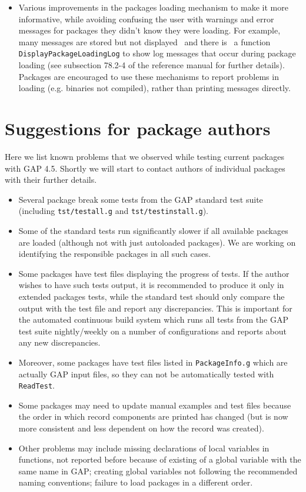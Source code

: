 \documentclass[10pt]{article}
\begin{document}
\begin{itemize}
\item
Various improvements in the packages loading mechanism to make it more
informative, while avoiding confusing the user with warnings and error 
messages for packages they didn't
know they were loading. For example, many messages are stored but not 
displayed \, and there is \, a function {\tt DisplayPackageLoadingLog} to show 
log messages that 
occur during package loading (see subsection 78.2-4 of the reference manual for further details).  
Packages are encouraged 
to use these mechanisms to report problems in loading (e.g. binaries not compiled), rather than printing messages directly.
\end{itemize}


\section{Suggestions for package authors}

Here we list known problems that we observed while testing current packages 
with GAP 4.5. Shortly we will start to contact authors of individual 
packages with their further details.

\begin{itemize}

\item
Several package break some tests from the GAP standard test suite 
(including \verb|tst/testall.g| and \verb|tst/testinstall.g|).

\item
Some of the standard tests run 
significantly slower if all available packages are loaded (although not with 
just autoloaded packages). 
We are working on identifying  the responsible packages in all such cases.

\item
Some packages have test files displaying the progress of tests. If the 
author wishes to have such tests output, it is recommended to produce it only
in extended packages tests, while the standard test should only compare the 
output with the test file and report any discrepancies. This is important for
the automated continuous build system which runs all tests from the GAP test
suite nightly/weekly on a number of configurations and reports about any new
discrepancies. 

\item
Moreover, some packages have test files listed in {\tt PackageInfo.g}
which are actually GAP input files, so they can not be automatically tested
with {\tt ReadTest}.

\item
Some packages may need to update manual examples and test files
 because the order in which record components are 
printed has changed (but is now more consistent and less dependent on how the record was created).


\item
Other problems may include missing declarations of local variables in 
functions, not reported before because of existing of a global variable with
the same name in GAP; creating global variables not following the recommended 
naming conventions; failure to load packages in a different order.
\end{itemize}
\end{document}
